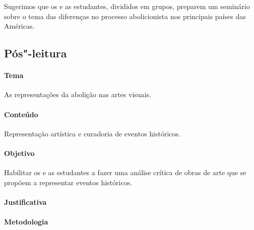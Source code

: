 \documentclass[11pt]{extarticle}
\begin{document}
Sugerimos que os e as estudantes, divididos em grupos, preparem um seminário sobre o tema
das diferenças no processo abolicionista nos principais países das Américas. 


\subsection{Pós"-leitura}

\paragraph{Tema} As representações da abolição nas artes visuais.

\paragraph{Conteúdo} Representação artística e curadoria de eventos históricos.

\paragraph{Objetivo} Habilitar os e as estudantes a fazer uma análise
crítica de obras de arte que se propõem a representar eventos históricos.

\paragraph{Justificativa} 

\paragraph{Metodologia} 
\end{document}

